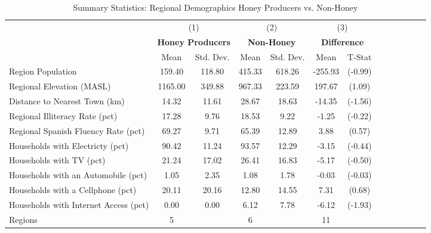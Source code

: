 \begin{table}[htbp]\centering \small
\def\sym#1{\ifmmode^{#1}\else\(^{#1}\)\fi}
\caption{Summary Statistics: Regional Demographics Honey Producers vs. Non-Honey \label{summary_communities}}
\begin{tabular}{l*{3}{cccc}}
\toprule
                &\multicolumn{2}{c}{(1)}&\multicolumn{2}{c}{(2)}&\multicolumn{2}{c}{(3)}     \\
                &\multicolumn{2}{c}{\textbf{Honey Producers}}&\multicolumn{2}{c}{\textbf{  Non-Honey  }}&\multicolumn{2}{c}{\textbf{Difference}}\\
                &     Mean&Std. Dev.&     Mean&Std. Dev.&     Mean         &   T-Stat\\
\midrule
Region Population&   159.40&   118.80&   415.33&   618.26&  -255.93         &  (-0.99)\\
\addlinespace
Regional Elevation (MASL)&  1165.00&   349.88&   967.33&   223.59&   197.67         &   (1.09)\\
\addlinespace
Distance to Nearest Town (km)&    14.32&    11.61&    28.67&    18.63&   -14.35         &  (-1.56)\\
\addlinespace
Regional Illiteracy Rate (pct)&    17.28&     9.76&    18.53&     9.22&    -1.25         &  (-0.22)\\
\addlinespace
Regional Spanish Fluency Rate (pct)&    69.27&     9.71&    65.39&    12.89&     3.88         &   (0.57)\\
\addlinespace
Households with Electricty (pct)&    90.42&    11.24&    93.57&    12.29&    -3.15         &  (-0.44)\\
\addlinespace
Households with TV (pct)&    21.24&    17.02&    26.41&    16.83&    -5.17         &  (-0.50)\\
\addlinespace
Households with an Automobile (pct)&     1.05&     2.35&     1.08&     1.78&    -0.03         &  (-0.03)\\
\addlinespace
Households with a Cellphone (pct)&    20.11&    20.16&    12.80&    14.55&     7.31         &   (0.68)\\
\addlinespace
Households with Internet Access (pct)&     0.00&     0.00&     6.12&     7.78&    -6.12         &  (-1.93)\\
\midrule
Regions    &        5&         &        6&         &       11         &         \\
\bottomrule
\end{tabular}
\end{table}
